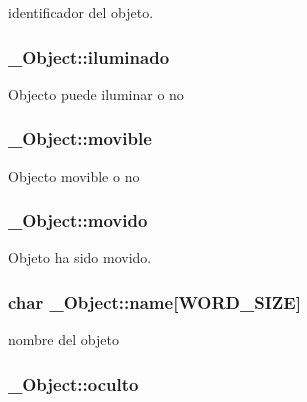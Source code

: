 identificador del objeto. \hypertarget{struct__Object_afcf4d46d3327646477e5e70bb0535653}{
\subsubsection[{iluminado}]{ \+\_\+\+Object\+::iluminado}}\label{struct__Object_afcf4d46d3327646477e5e70bb0535653}
Objecto puede iluminar o no \hypertarget{struct__Object_a182b654831db35840643f7ac44dba937}{
\subsubsection[{movible}]{ \+\_\+\+Object\+::movible}}\label{struct__Object_a182b654831db35840643f7ac44dba937}
Objecto movible o no \hypertarget{struct__Object_aa2e3f6d7b7b8e2ed9b42b550650dd1e5}{
\subsubsection[{movido}]{ \+\_\+\+Object\+::movido}}\label{struct__Object_aa2e3f6d7b7b8e2ed9b42b550650dd1e5}
Objeto ha sido movido. \hypertarget{struct__Object_a3dab853826b88558a2c07dec50b96d57}{
\subsubsection[{name}]{\setlength{\rightskip}{0pt plus 5cm}char \+\_\+\+Object\+::name\mbox{[}{\bf W\+O\+R\+D\+\_\+\+S\+I\+Z\+E}\mbox{]}}}\label{struct__Object_a3dab853826b88558a2c07dec50b96d57}
nombre del objeto \hypertarget{struct__Object_ae80a5867852e78b0c158844c280b2d5a}{
\subsubsection[{oculto}]{ \+\_\+\+Object\+::oculto}}\label{struct__Object_ae80a5867852e78b0c158844c280b2d5a}
